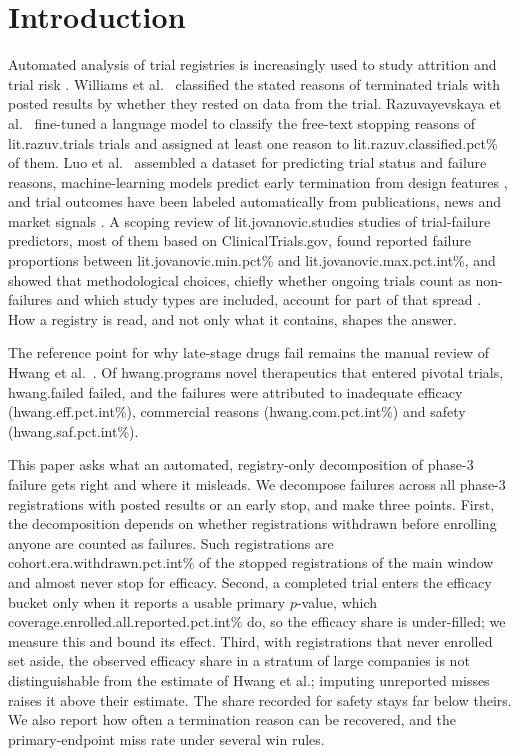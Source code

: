 \documentclass[11pt]{article}
\begin{document}
\section{Introduction}\label{sec:intro}
Automated analysis of trial registries is increasingly used to study attrition and trial risk \cite{teodoro2025}. Williams et al.\ \cite{williams2015} classified the stated reasons of terminated trials with posted results by whether they rested on data from the trial. Razuvayevskaya et al.\ \cite{razuv2024} fine-tuned a language model to classify the free-text stopping reasons of \num{lit.razuv.trials} trials and assigned at least one reason to \num{lit.razuv.classified.pct}\% of them. Luo et al.\ \cite{luo2023} assembled a dataset for predicting trial status and failure reasons, machine-learning models predict early termination from design features \cite{kavalci2023}, and trial outcomes have been labeled automatically from publications, news and market signals \cite{gao2024}. A scoping review of \num{lit.jovanovic.studies} studies of trial-failure predictors, most of them based on ClinicalTrials.gov, found reported failure proportions between \num{lit.jovanovic.min.pct}\% and \num{lit.jovanovic.max.pct.int}\%, and showed that methodological choices, chiefly whether ongoing trials count as non-failures and which study types are included, account for part of that spread \cite{jovanovic2026}. How a registry is read, and not only what it contains, shapes the answer.

The reference point for why late-stage drugs fail remains the manual review of Hwang et al.\ \cite{hwang2016}. Of \num{hwang.programs} novel therapeutics that entered pivotal trials, \num{hwang.failed} failed, and the failures were attributed to inadequate efficacy (\num{hwang.eff.pct.int}\%), commercial reasons (\num{hwang.com.pct.int}\%) and safety (\num{hwang.saf.pct.int}\%).

This paper asks what an automated, registry-only decomposition of phase-3 failure gets right and where it misleads. We decompose failures across all phase-3 registrations with posted results or an early stop, and make three points. First, the decomposition depends on whether registrations withdrawn before enrolling anyone are counted as failures. Such registrations are \num{cohort.era.withdrawn.pct.int}\% of the stopped registrations of the main window and almost never stop for efficacy. Second, a completed trial enters the efficacy bucket only when it reports a usable primary $p$-value, which \num{coverage.enrolled.all.reported.pct.int}\% do, so the efficacy share is under-filled; we measure this and bound its effect. Third, with registrations that never enrolled set aside, the observed efficacy share in a stratum of large companies is not distinguishable from the estimate of Hwang et al.; imputing unreported misses raises it above their estimate. The share recorded for safety stays far below theirs. We also report how often a termination reason can be recovered, and the primary-endpoint miss rate under several win rules.
\end{document}
